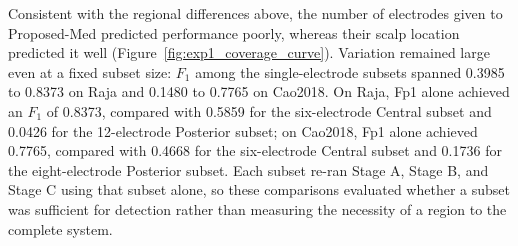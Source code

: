 Consistent with the regional differences above, the number of electrodes given to Proposed-Med predicted performance poorly, whereas their scalp location predicted it well (Figure~\ref{fig:exp1_coverage_curve}). Variation remained large even at a fixed subset size: $F_1$ among the single-electrode subsets spanned 0.3985 to 0.8373 on Raja and 0.1480 to 0.7765 on Cao2018. On Raja, Fp1 alone achieved an $F_1$ of 0.8373, compared with 0.5859 for the six-electrode Central subset and 0.0426 for the 12-electrode Posterior subset; on Cao2018, Fp1 alone achieved 0.7765, compared with 0.4668 for the six-electrode Central subset and 0.1736 for the eight-electrode Posterior subset. Each subset re-ran Stage A, Stage B, and Stage C using that subset alone, so these comparisons evaluated whether a subset was sufficient for detection rather than measuring the necessity of a region to the complete system.
